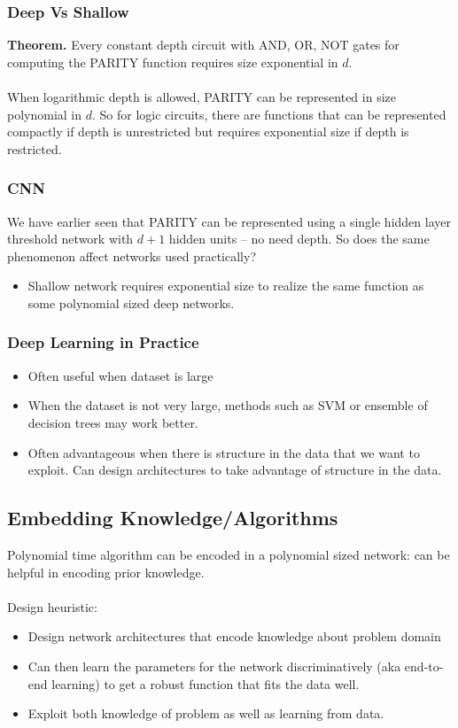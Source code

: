 \documentclass{article}
\begin{document}
   \subsubsection{Deep Vs Shallow}
   \textbf{Theorem.} Every constant depth circuit with AND, OR, NOT gates for computing the PARITY function requires size exponential in $d$. 
   \\\\
   When logarithmic depth is allowed, PARITY can be represented in size polynomial in $d$. So for logic circuits, there are functions that can be represented compactly if depth is unrestricted but requires exponential size if depth is restricted.
   
   \subsubsection{CNN}
   We have earlier seen that PARITY can be represented using a single hidden layer threshold network with $d+1$ hidden units -- no need depth. So does the same phenomenon affect networks used practically?
   \begin{itemize}
   \item Shallow network requires exponential size to realize the same function as some polynomial sized deep networks.
   \end{itemize}
   
   \subsubsection{Deep Learning in Practice}
   \begin{itemize}
   \item Often useful when dataset is large
   \item When the dataset is not very large, methods such as SVM or ensemble of decision trees may work better.
   \item Often advantageous when there is structure in the data that we want to exploit. Can design architectures to take advantage of structure in the data.
   \end{itemize}
   
   \subsection{Embedding Knowledge/Algorithms}
   Polynomial time algorithm can be encoded in a polynomial sized network: can be helpful in encoding prior knowledge.
   \\\\
   Design heuristic:
   \begin{itemize}
   \item Design network architectures that encode knowledge about problem domain
   \item Can then learn the parameters for the network discriminatively (aka end-to-end learning) to get a robust function that fits the data well.
   \item Exploit both knowledge of problem as well as learning from data.
   \end{itemize}
   
\end{document}
